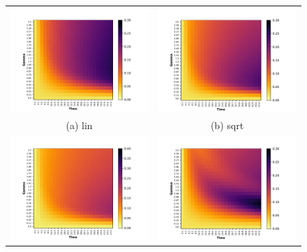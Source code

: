 \begin{figure}[ht]
\centering
\begin{tabular}{cc}
  \includegraphics[width=75mm]{./figures/time_dependent_heatmap/47_heatmap_time_dependent_lin.pdf} &   \includegraphics[width=75mm]{./figures/time_dependent_heatmap/47_heatmap_time_dependent_sqrt.pdf} \\
(a) lin & (b) sqrt\\[6pt]
\includegraphics[width=75mm]{./figures/time_dependent_heatmap/47_heatmap_time_dependent_cbrt.pdf} &   \includegraphics[width=75mm]{./figures/time_dependent_heatmap/47_heatmap_time_dependent_cerf.pdf} \\

\end{tabular}
\end{figure}
